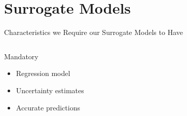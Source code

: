 \section{Surrogate Models}
\begin{frame}[c]{Characteristics we Require our Surrogate Models to Have}

\begin{columns}[T] %
\begin{column}{.48\textwidth}
    \begin{block}{Mandatory}
    \begin{itemize}
    	\item<1-6> Regression model
    	\item<2-6> Uncertainty estimates
    	\item<3-6> Accurate predictions
    \end{itemize}
    \end{block}
    
    
\end{column}%

\hfill%

\begin{column}{.48\textwidth}


\end{column}
\end{columns}
\end{frame}
